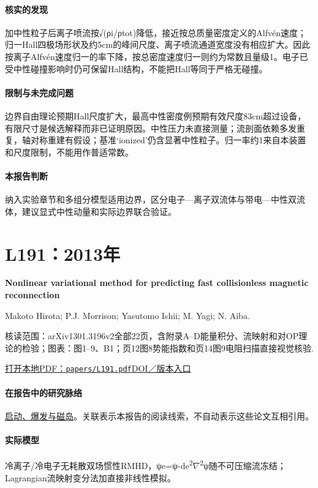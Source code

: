 \documentclass[UTF8,a4paper,11pt,openany,fontset=fandol]{ctexbook}
\begin{document}
\paragraph{核实的发现}加中性粒子后离子喷流按√(ρi/ρtot)降低，接近按总质量密度定义的Alfvén速度；归一Hall四极场形状及约5cm的峰间尺度、离子喷流通道宽度没有相应扩大。因此按离子Alfvén速度归一的率下降，按总密度速度归一则约为常数且量级1。电子已受中性碰撞影响时仍可保留Hall结构，不能把Hall等同于严格无碰撞。

\paragraph{限制与未完成问题}边界自由理论预期Hall尺度扩大，最高中性密度例预期有效尺度83cm超过设备，有限尺寸是候选解释而非已证明原因。中性压力未直接测量；流剖面依赖多发重复，轴对称重建有假设；基准‘ionized’仍含显著中性粒子。归一率约1来自本装置和尺度限制，不能用作普适常数。

\paragraph{本报告判断}纳入实验章节和多组分模型适用边界，区分电子—离子双流体与带电—中性双流体，建议显式中性动量和实际边界联合验证。

\section{L191：2013年}\label{paper:L191}

\textbf{Nonlinear variational method for predicting fast collisionless magnetic reconnection}\citep{L191}\

Makoto Hirota;  P.J. Morrison;  Yasutomo Ishii;  M. Yagi;  N. Aiba.

\textsf{核读范围：}arXiv1301.3196v2全部22页，含附录A–D能量积分、流映射和对OP理论的检验；\textsf{图表：}图1–9、B1；页12图8势能指数和页14图9电阻扫描直接视觉核验.

\href{run:../papers/L191.pdf}{打开本地PDF：\texttt{papers/L191.pdf}}\quad\href{https://doi.org/10.1088/0029-5515/53/6/063024}{DOI／版本入口}

\paragraph{在报告中的研究脉络}\hyperref[story:onset]{启动、爆发与磁岛}。关联表示本报告的阅读线索，不自动表示这些论文互相引用。

\paragraph{实际模型}冷离子/冷电子无耗散双场惯性RMHD，ψe=ψ-de\textsuperscript{2}\ensuremath{\nabla}\textsuperscript{2}ψ随不可压缩流冻结；Lagrangian流映射变分法加直接非线性模拟。
\end{document}
